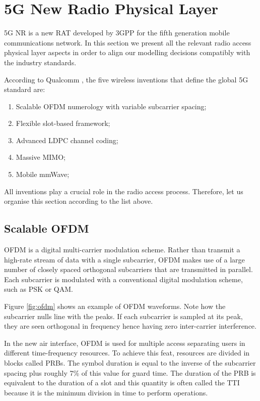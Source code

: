 \section{5G New Radio Physical Layer}
\label{sec:5gphy}


5G \ac{NR} is a new \ac{RAT} developed by \ac{3GPP} for the fifth generation mobile communications network. In this section we present all the relevant radio access physical layer aspects in order to align our modelling decisions compatibly with the industry standards.

According to Qualcomm \cite{qualcomm_innovative_five}, the five wireless inventions that define the global 5G standard are:

\begin{enumerate}
    \item Scalable \acs{OFDM} numerology with variable subcarrier spacing;
    \item Flexible slot-based framework;
    \item Advanced \ac{LDPC} channel coding;
    \item Massive MIMO;
    \item Mobile mmWave;
\end{enumerate}

All inventions play a crucial role in the radio access process. Therefore, let us organise this section according to the list above. 


\subsection*{Scalable OFDM}

\ac{OFDM} is a digital multi-carrier modulation scheme. Rather than transmit a high-rate stream of data with a single subcarrier, \ac{OFDM} makes use of a large number of closely spaced orthogonal subcarriers that are transmitted in parallel. Each subcarrier is modulated with a conventional digital modulation scheme, such as \ac{PSK} or \ac{QAM}. 

Figure \ref{fig:ofdm} shows an example of OFDM waveforms. Note how the subcarrier nulls line with the peaks. If each subcarrier is sampled at its peak, they are seen orthogonal in frequency hence having zero inter-carrier interference.



In the new air interface, \ac{OFDM} is used for multiple access separating users in different time-frequency resources. To achieve this feat, resources are divided in blocks called \acp{PRB}.  The symbol duration is equal to the inverse of the subcarrier spacing plus roughly 7\% of this value for guard time. The duration of the PRB is equivalent to the duration of a slot and this quantity is often called the \ac{TTI} because it is the minimum division in time to perform operations. 

